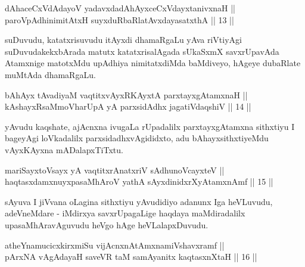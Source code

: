 
\begin{shl}
dAhaceCxVdAdayoV yadavxdadAhAyxceCxVdayxtanivxnaH || \\
paroVpAdhinimitAtxH suyxduRbaRlatAvxdayasatxthA \hfill || 13 ||
  
\end{shl}

\begin{artha}
suDuvudu, katatxrisuvudu itAyxdi dhamaRgaLu yAva riVtiyAgi
suDuvudakekxbArada matutx katatxrisalAgada sUkaSxmX savxrUpavAda
Atamxnige matotxMdu upAdhiya nimitatxdiMda baMdiveyo, hAgeye dubaRlate
muMtAda dhamaRgaLu.
\end{artha}


\begin{shl}
bAhAyx tAvadiyaM vaqtitxvAyxRKAyxtA parxtayxgAtamxnaH || \\
kAshayxRsaMmoVharUpA yA parxsidAdhx jagatiVdaqshiV \hfill || 14 ||
  
\end{shl}

\begin{artha}
yAvudu kaqshate, ajAcnxna ivugaLa rUpadalilx parxtayxgAtamxna
sithxtiyu I bageyAgi loVkadalilx parxsidadhxvAgididxto, adu
bAhayxsithxtiyeMdu vAyxKAyxna mADalapxTiTxtu.
\end{artha}


\begin{shl}
mariSayxtoV\s sayx yA vaqtitxrAnatxriV sA\s dhunoVcayxteV ||  \\
haqtasxdamxnuyxpasaMhAroV yathA sAyxdinidxrXyAtamxnAmf \hfill || 15 ||
  
\end{shl}

\begin{artha}
sAyuva I jiVvana oLagina sithxtiyu yAvudidiyo adanunx Iga heVLuvudu,
adeVneMdare - iMdirxya savxrUpagaLige haqdaya maMdiradalilx
upasaMhAravAguvudu heVgo hAge heVLalapxDuvudu.
\end{artha}


\begin{shl}
atheYnamucicxkirxmiSu vijAcnxnAtAmxnamiVshavxramf || \\
pArxNA vAgAdayaH saveVR taM samAyanitx kaqtasxnXtaH \hfill || 16 ||
  
\end{shl}

